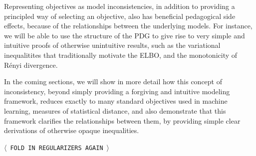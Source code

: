 \documentclass[twoside]{article}
\theoremstyle{plain}
\theoremstyle{definition}
\newcommand{\TODO}[1][INCOMPLETE]{{\centering\Large\color{red}$\langle$~\texttt{#1}~$\rangle$\par}}
\begin{document}

Representing objectives as model inconsistencies, in addition to providing a principled way of selecting an objective, also has beneficial pedagogical side effects, because of the relationships between the underlying models.
For instance, we will be able to use the structure of the PDG to give rise to
very simple and intuitive proofs of otherwise unintuitive results,
such as the variational inequalitites that traditionally motivate the ELBO,
and the monotonicity of R\'enyi divergence.




In the coming sections, we will show in more detail how this concept of inconsistency, beyond simply providing a forgiving and intuitive modeling framework, reduces exactly to many standard objectives used in machine learning, measures of statistical distance, and also demonstrate that this framework clarifies the relationships between them, by providing simple clear derivations of otherwise opaque inequalities.


\TODO[FOLD IN REGULARIZERS AGAIN]
% 
\end{document}
